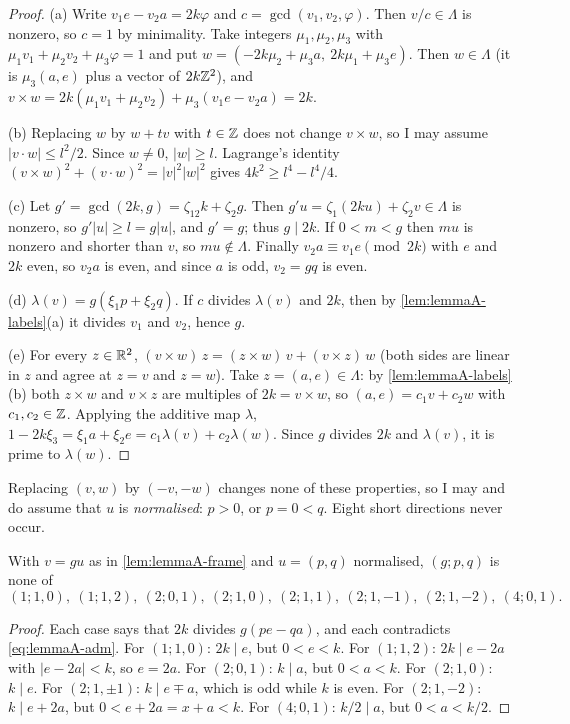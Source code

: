 \begin{proof}
(a) Write $v_1e-v_2a=2k\varphi$ and $c=\gcd(v_1,v_2,\varphi)$. Then
$v/c\in\Lambda$ is nonzero, so $c=1$ by minimality. Take integers
$\mu_1,\mu_2,\mu_3$ with $\mu_1v_1+\mu_2v_2+\mu_3\varphi=1$ and put
$w=(-2k\mu_2+\mu_3a,\ 2k\mu_1+\mu_3e)$. Then $w\in\Lambda$ (it is
$\mu_3(a,e)$ plus a vector of $2k\mathbb{Z}^2$), and
$v\times w=2k(\mu_1v_1+\mu_2v_2)+\mu_3(v_1e-v_2a)=2k$.

(b) Replacing $w$ by $w+tv$ with $t\in\mathbb{Z}$ does not change $v\times w$, so I
may assume $|v\cdot w|\le l^2/2$. Since $w\ne0$, $|w|\ge l$. Lagrange's
identity $(v\times w)^2+(v\cdot w)^2=|v|^2|w|^2$ gives
$4k^2\ge l^4-l^4/4$.

(c) Let $g'=\gcd(2k,g)=\zeta_12k+\zeta_2g$. Then $g'u=\zeta_1(2ku)+\zeta_2v\in\Lambda$
is nonzero, so $g'|u|\ge l=g|u|$, and $g'=g$; thus $g\mid2k$. If $0<m<g$ then
$mu$ is nonzero and shorter than $v$, so $mu\notin\Lambda$. Finally
$v_2a\equiv v_1e\pmod{2k}$ with $e$ and $2k$ even, so $v_2a$ is even, and
since $a$ is odd, $v_2=gq$ is even.

(d) $\lambda(v)=g(\xi_1 p+\xi_2 q)$. If $c$ divides $\lambda(v)$ and $2k$,
then by \autoref{lem:lemmaA-labels}(a) it divides $v_1$ and $v_2$, hence $g$.

(e) For every $z\in\mathbb{R}^2$, $(v\times w)\,z=(z\times w)\,v+(v\times z)\,w$
(both sides are linear in $z$ and agree at $z=v$ and $z=w$). Take
$z=(a,e)\in\Lambda$: by \autoref{lem:lemmaA-labels}(b) both $z\times w$ and
$v\times z$ are multiples of $2k=v\times w$, so $(a,e)=c_1v+c_2w$ with
$c_1,c_2\in\mathbb{Z}$. Applying the additive map $\lambda$,
$1-2k\xi_3=\xi_1 a+\xi_2 e=c_1\lambda(v)+c_2\lambda(w)$. Since $g$ divides
$2k$ and $\lambda(v)$, it is prime to $\lambda(w)$.
\end{proof}

Replacing $(v,w)$ by $(-v,-w)$ changes none of these properties, so I may
and do assume that $u$ is \emph{normalised}: $p>0$, or $p=0<q$. Eight short
directions never occur.

\begin{lemma}
\label{lem:lemmaA-zero}
With $v=gu$ as in \autoref{lem:lemmaA-frame} and $u=(p,q)$ normalised,
$(g;p,q)$ is none of
\[
(1;1,0),\ (1;1,2),\ (2;0,1),\ (2;1,0),\ (2;1,1),\ (2;1,-1),\ (2;1,-2),\
(4;0,1).
\]
\end{lemma}

\begin{proof}
Each case says that $2k$ divides $g(pe-qa)$, and each contradicts
\eqref{eq:lemmaA-adm}. For $(1;1,0)$: $2k\mid e$, but $0<e<k$.
For $(1;1,2)$: $2k\mid e-2a$ with $|e-2a|<k$, so $e=2a$. For $(2;0,1)$:
$k\mid a$, but $0<a<k$. For $(2;1,0)$: $k\mid e$. For $(2;1,\pm1)$:
$k\mid e\mp a$, which is odd while $k$ is even. For $(2;1,-2)$: $k\mid e+2a$,
but $0<e+2a=x+a<k$. For $(4;0,1)$: $k/2\mid a$, but $0<a<k/2$.
\end{proof}


